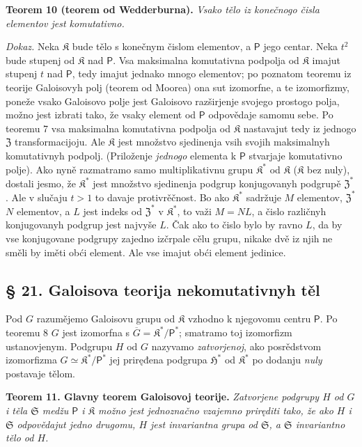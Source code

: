 \documentclass[11pt]{article}
\begin{document}
\textbf{Teorem 10 (teorem od Wedderburna).} \emph{Vsako tělo iz konečnogo čisla elementov jest komutativno.}

\emph{Dokaz.} Neka \(\mathfrak K\) bude tělo s konečnym čislom elementov, a \(\mathsf P\) jego centar. Neka \(t^2\) bude stupenj od \(\mathfrak K\) nad \(\mathsf P\). Vsa maksimalna komutativna podpolja od \(\mathfrak K\) imajut stupenj \(t\) nad \(\mathsf P\), tedy imajut jednako mnogo elementov; po poznatom teoremu iz teorije Galoisovyh polj (teorem od Moorea) ona sut izomorfne, a te izomorfizmy, poneže vsako Galoisovo polje jest Galoisovo razširjenje svojego prostogo polja, možno jest izbrati tako, že vsaky element od \(\mathsf P\) odpovědaje samomu sebe. Po teoremu 7 vsa maksimalna komutativna podpolja od \(\mathfrak K\) nastavajut tedy iz jednogo \(\mathfrak Z\) transformacijoju. Ale \(\mathfrak K\) jest množstvo sjedinenja vsih svojih maksimalnyh komutativnyh podpolj. (Priloženje \emph{jednogo} elementa k \(\mathsf P\) stvarjaje komutativno polje). Ako nyně razmatramo samo multiplikativnu grupu \(\mathfrak K^*\) od \(\mathfrak K\) (\(\mathfrak K\) bez nuly), dostali jesmo, že \(\mathfrak K^*\) jest množstvo sjedinenja podgrup konjugovanyh podgrupě \(\mathfrak Z^*\). Ale v slučaju \(t>1\) to davaje protivrěčnost. Bo ako \(\mathfrak K^*\) sadržuje \(M\) elementov, \(\mathfrak Z^*\) \(N\) elementov, a \(L\) jest indeks od \(\mathfrak Z^*\) v \(\mathfrak K^*\), to važi \(M=NL\), a čislo različnyh konjugovanyh podgrup jest najvyše \(L\). Čak ako to čislo bylo by ravno \(L\), da by vse konjugovane podgrupy zajedno izčrpale cělu grupu, nikake dvě iz njih ne směli by iměti obći element. Ale vse imajut obći element jedinice.

\subsection*{§ 21. Galoisova teorija nekomutativnyh těl}\label{die-galoissche-theorie-der-nichtkommutativen-koerper}

Pod \(G\) razumějemo Galoisovu grupu od \(\mathfrak K\) vzhodno k njegovomu centru \(\mathsf P\). Po teoremu 8 \(G\) jest izomorfna s \(\overline G=\mathfrak K^*/\mathsf P^*\); smatramo toj izomorfizm ustanovjenym. Podgrupu \(H\) od \(G\) nazyvamo \emph{zatvorjenoj}, ako posrědstvom izomorfizma \(G\simeq\mathfrak K^*/\mathsf P^*\) jej priręđena podgrupa \(\mathfrak H^*\) od \(\mathfrak K^*\) po dodanju \emph{nuly} postavaje tělom.


\textbf{Teorem 11. Glavny teorem Galoisovoj teorije.} \emph{Zatvorjene podgrupy \(H\) od \(G\) i těla \(\mathfrak S\) medžu \(\mathsf P\) i \(\mathfrak K\) možno jest jednoznačno vzajemno priręditi tako, že ako \(H\) i \(\mathfrak S\) odpovědajut jedno drugomu, \(H\) jest invariantna grupa od \(\mathfrak S\), a \(\mathfrak S\) invariantno tělo od \(H\).}
\end{document}
